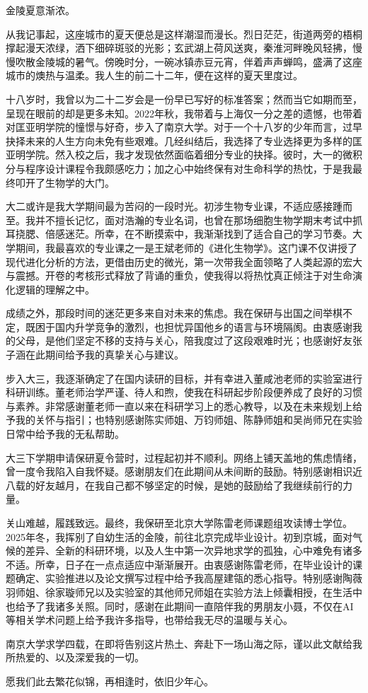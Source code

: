 \documentclass[
    fontset = fandol, %
  ]{njuthesis}
\begin{document}
\begin{acknowledgement}
  金陵夏意渐浓。
  
  从我记事起，这座城市的夏天便总是这样潮湿而漫长。烈日茫茫，街道两旁的梧桐撑起漫天浓绿，洒下细碎斑驳的光影；玄武湖上荷风送爽，秦淮河畔晚风轻拂，慢慢吹散金陵城的暑气。傍晚时分，一碗冰镇赤豆元宵，伴着声声蝉鸣，盛满了这座城市的燠热与温柔。我人生的前二十二年，便在这样的夏天里度过。
  
  十八岁时，我曾以为二十二岁会是一份早已写好的标准答案；然而当它如期而至，呈现在眼前的却是更多未知。2022年秋，我带着与上海仅一分之差的遗憾，也带着对匡亚明学院的憧憬与好奇，步入了南京大学。对于一个十八岁的少年而言，过早抉择未来的人生方向未免有些艰难。几经纠结后，我选择了专业选择更为多样的匡亚明学院。然入校之后，我才发现依然面临着细分专业的抉择。彼时，大一的微积分与程序设计课程令我颇感吃力；加之心中始终保有对生命科学的热忱，于是我最终叩开了生物学的大门。
  
  大二或许是我大学期间最为苦闷的一段时光。初涉生物专业课，不适应感接踵而至。我并不擅长记忆，面对浩瀚的专业名词，也曾在那场细胞生物学期末考试中抓耳挠腮、倍感迷茫。所幸，在不断摸索中，我渐渐找到了适合自己的学习节奏。大学期间，我最喜欢的专业课之一是王斌老师的《进化生物学》。这门课不仅讲授了现代进化分析的方法，更借由历史的微光，第一次带我全面领略了人类起源的宏大与震撼。开卷的考核形式释放了背诵的重负，使我得以将热忱真正倾注于对生命演化逻辑的理解之中。
  
  成绩之外，那段时间的迷茫更多来自对未来的焦虑。我在保研与出国之间举棋不定，既困于国内升学竞争的激烈，也担忧异国他乡的语言与环境隔阂。由衷感谢我的父母，是他们坚定不移的支持与关心，陪我度过了这段艰难时光；也感谢好友张子涵在此期间给予我的真挚关心与建议。
  
  步入大三，我逐渐确定了在国内读研的目标，并有幸进入董咸池老师的实验室进行科研训练。董老师治学严谨、待人和煦，使我在科研起步阶段便养成了良好的习惯与素养。非常感谢董老师一直以来在科研学习上的悉心教导，以及在未来规划上给予我的关怀与指引；也特别感谢陈实师姐、万钧师姐、陈静师姐和吴尚师兄在实验日常中给予我的无私帮助。
  
  大三下学期申请保研夏令营时，过程起初并不顺利。网络上铺天盖地的焦虑情绪，曾一度令我陷入自我怀疑。感谢朋友们在此期间从未间断的鼓励。特别感谢相识近八载的好友越月，在我自己都不够坚定的时候，是她的鼓励给了我继续前行的力量。
  
  关山难越，履践致远。最终，我保研至北京大学陈雷老师课题组攻读博士学位。2025年冬，我挥别了自幼生活的金陵，前往北京完成毕业设计。初到京城，面对气候的差异、全新的科研环境，以及人生中第一次异地求学的孤独，心中难免有诸多不适。所幸，日子在一点点适应中渐渐展开。由衷感谢陈雷老师，在毕业设计的课题确定、实验推进以及论文撰写过程中给予我高屋建瓴的悉心指导。特别感谢陶薇羽师姐、徐家璇师兄以及实验室的其他师兄师姐在实验方法上倾囊相授，在生活中也给予了我诸多关照。同时，感谢在此期间一直陪伴我的男朋友小聂，不仅在AI等相关学术问题上给予我许多指导，也带给我无尽的温暖与关心。
  
  南京大学求学四载，在即将告别这片热土、奔赴下一场山海之际，谨以此文献给我所热爱的、以及深爱我的一切。
  
  愿我们此去繁花似锦，再相逢时，依旧少年心。
  
\end{acknowledgement}
\end{document}
